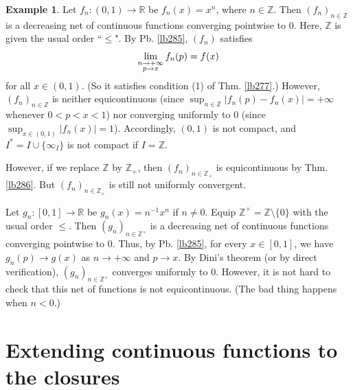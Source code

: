 \documentclass[12pt,b5paper,notitlepage]{article}
\theoremstyle{definition}
\newtheorem{eg}[df]{Example}
\theoremstyle{plain}
\newcommand{\Zbb}{\mathbb Z}
\newcommand{\Rbb}{\mathbb R}
\numberwithin{equation}{section}
\begin{document}
\begin{eg}\label{lb401}
Let $f_n:(0,1)\rightarrow \Rbb$ be $f_n(x)=x^n$, where $n\in\Zbb$. Then $(f_n)_{n\in\Zbb}$ is a decreasing net of continuous functions converging pointwise to $0$. Here, $\Zbb$ is given the usual order ``$\leq$". By Pb. \ref{lb285}, $(f_n)$ satisfies
\begin{align*}
\lim_{
\begin{subarray}{c}
n\rightarrow+\infty\\
p\rightarrow x
\end{subarray}
}f_n(p)=f(x)
\end{align*}
for all $x\in (0,1)$. (So it satisfies condition (1) of Thm. \ref{lb277}.) However, $(f_n)_{n\in\Zbb}$ is neither equicontinuous (since $\sup_{n\in\Zbb}|f_n(p)-f_n(x)|=+\infty$ whenever $0<p<x<1$) nor converging uniformly to $0$ (since $\sup_{x\in (0,1)}|f_n(x)|=1$). Accordingly, $(0,1)$ is not compact, and $I^*=I\cup\{\infty_I\}$ is not compact if $I=\Zbb$. 

However, if we replace $\Zbb$ by $\Zbb_+$, then $(f_n)_{n\in\Zbb_+}$ is equicontinuous by Thm. \ref{lb286}. But $(f_n)_{n\in\Zbb_+}$ is still not uniformly convergent.

Let $g_n:[0,1]\rightarrow\Rbb$ be $g_n(x)=n^{-1}x^n$ if $n\neq0$. Equip $\Zbb^\times=\Zbb\setminus\{0\}$ with the usual order $\leq$. Then $(g_n)_{n\in\Zbb^\times}$ is a decreasing net of continuous functions converging pointwise to $0$.  Thus, by Pb. \ref{lb285}, for every $x\in[0,1]$, we have $g_n(p)\rightarrow g(x)$ as $n\rightarrow+\infty$ and $p\rightarrow x$. By Dini's theorem (or by direct verification), $(g_n)_{n\in\Zbb^\times}$ converges uniformly to $0$. However, it is not hard to check that this net of functions is not equicontinuous. (The bad thing happens when $n<0$.)  \hfill\qedsymbol
\end{eg}


















\newpage


\section{Extending continuous functions to the closures}
\end{document}
